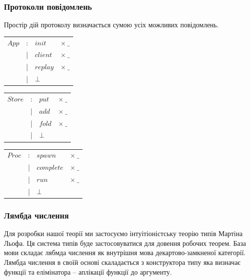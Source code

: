 \documentclass[11pt,oneside]{article}
\begin{document}
  \subsubsection*{Протоколи повідомлень}

   Простір дій протоколу визначається сумою усіх можливих повідомлень.

\vspace{0.5cm}

\begingroup
\parbox[l][][t]{0.33\textwidth}
{
\begin{tabular}{llll}
$App$       &:& $init$    & $\times\ \_$            \\
            &|& $client$  & $\times\ \_$          \\
            &|& $replay$  & $\times\ \_$          \\
            &|& $\bot$    & \\
\end{tabular}
}
\hspace{0.1cm}
\parbox[l][][t]{0.33\textwidth}
{
\begin{tabular}{llll}
$Store$     &:& $put$     & $\times\ \_$          \\
            &|& $add$     & $\times\ \_$          \\
            &|& $fold$    & $\times\ \_$         \\
            &|& $\bot$    & \\
\end{tabular}
}
\hspace{0.1cm}
\parbox[t][][t]{0.33\textwidth}
{
\begin{tabular}{llll}
$Proc$      &:& $spawn$       & $\times\ \_$      \\
            &|& $complete$    & $\times\ \_$         \\
            &|& $run$         & $\times\ \_$          \\
            &|& $\bot$        &
\end{tabular}
}
\endgroup

\newpage
  \subsubsection*{Лямбда числення}

Для розробки нашої теорії ми застосуємо інтуітіоністську теорію типів Мартіна Льофа.
Ця система типів буде застосовуватися для довення робочих теорем. База мови складає
лябмда числення як внутрішня мова декартово-замкненої категорії. Лямбда числення в своїй
основі скаладається з конструктора типу яка визначає функції та елімінатора -- аплікації
функції до аргументу.
\end{document}

